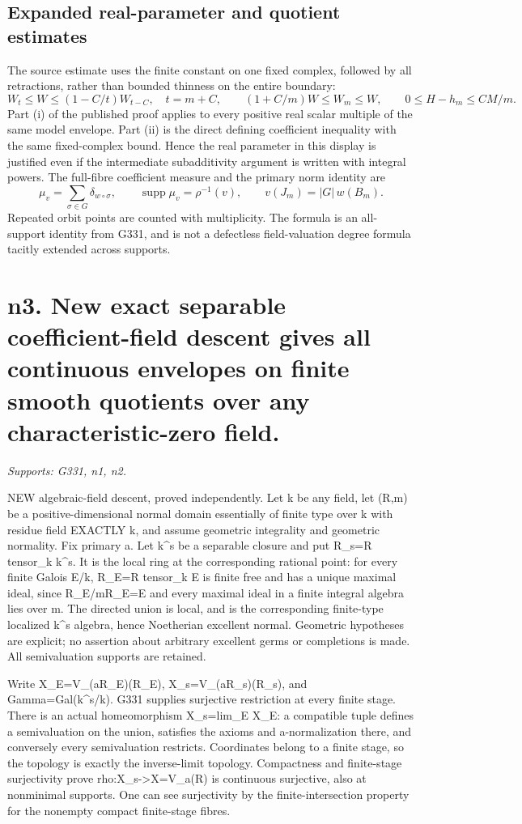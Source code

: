 \documentclass[11pt]{article}
\begin{document}
\subsection*{Expanded real-parameter and quotient estimates}
The source estimate uses the finite constant on one fixed complex, followed
by all retractions, rather than bounded thinness on the entire boundary:
\[
 W_t\le W\le(1-C/t)W_{t-C},\quad t=m+C,
 \qquad (1+C/m)W\le W_m\le W,
 \qquad 0\le H-h_m\le CM/m.
\]
Part (i) of the published proof applies to every positive real scalar
multiple of the same model envelope. Part (ii) is the direct defining
coefficient inequality with the same fixed-complex bound. Hence the real
parameter in this display is justified even if the intermediate
subadditivity argument is written with integral powers.
The full-fibre coefficient measure and the primary norm identity are
\[
 \mu_v=\sum_{\sigma\in G}\delta_{w\circ\sigma},\qquad
 \operatorname{supp}\mu_v=\rho^{-1}(v),\qquad
 v(J_m)=|G|\,w(B_m).
\]
Repeated orbit points are counted with multiplicity. The formula is an
all-support identity from G331, and is not a defectless field-valuation
degree formula tacitly extended across supports.


\section{n3. New exact separable coefficient-field descent gives all continuous envelopes on finite smooth quotients over any characteristic-zero field.}
\textit{Supports: G331, n1, n2.}

NEW algebraic-field descent, proved independently. Let k be any field, let (R,m) be a positive-dimensional normal domain essentially of finite type over k with residue field EXACTLY k, and assume geometric integrality and geometric normality. Fix primary a. Let k\textasciicircum{}s be a separable closure and put R\_s=R tensor\_k k\textasciicircum{}s. It is the local ring at the corresponding rational point: for every finite Galois E/k, R\_E=R tensor\_k E is finite free and has a unique maximal ideal, since R\_E/mR\_E=E and every maximal ideal in a finite integral algebra lies over m. The directed union is local, and is the corresponding finite-type localized k\textasciicircum{}s algebra, hence Noetherian excellent normal. Geometric hypotheses are explicit; no assertion about arbitrary excellent germs or completions is made. All semivaluation supports are retained.

Write X\_E=V\_(aR\_E)(R\_E), X\_s=V\_(aR\_s)(R\_s), and Gamma=Gal(k\textasciicircum{}s/k). G331 supplies surjective restriction at every finite stage. There is an actual homeomorphism X\_s=lim\_E X\_E: a compatible tuple defines a semivaluation on the union, satisfies the axioms and a-normalization there, and conversely every semivaluation restricts. Coordinates belong to a finite stage, so the topology is exactly the inverse-limit topology. Compactness and finite-stage surjectivity prove rho:X\_s-\textgreater{}X=V\_a(R) is continuous surjective, also at nonminimal supports. One can see surjectivity by the finite-intersection property for the nonempty compact finite-stage fibres.
\end{document}
